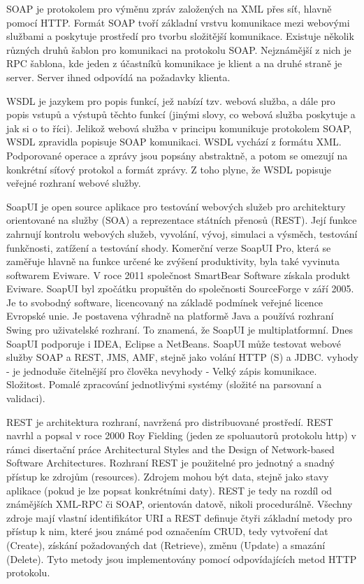 SOAP je protokolem pro výměnu zpráv založených na XML přes síť, hlavně pomocí HTTP. Formát SOAP tvoří základní vrstvu komunikace mezi webovými službami a poskytuje prostředí pro tvorbu složitější komunikace. Existuje několik různých druhů šablon pro komunikaci na protokolu SOAP. Nejznámější z nich je RPC šablona, kde jeden z účastníků komunikace je klient a na druhé straně je server. Server ihned odpovídá na požadavky klienta.

WSDL je jazykem pro popis funkcí, jež nabízí tzv. webová služba, a dále pro popis vstupů a výstupů těchto funkcí (jinými slovy, co webová služba poskytuje a jak si o to říci). Jelikož webová služba v principu komunikuje protokolem SOAP, WSDL zpravidla popisuje SOAP komunikaci. WSDL vychází z formátu XML. Podporované operace a zprávy jsou popsány abstraktně, a potom se omezují na konkrétní síťový protokol a formát zprávy. Z toho plyne, že WSDL popisuje veřejné rozhraní webové služby.

SoapUI je open source aplikace pro testování webových služeb pro architektury orientované na služby (SOA) a reprezentace státních přenosů (REST). Její funkce zahrnují kontrolu webových služeb, vyvolání, vývoj, simulaci a výsměch, testování funkčnosti, zatížení a testování shody. Komerční verze SoapUI Pro, která se zaměřuje hlavně na funkce určené ke zvýšení produktivity, byla také vyvinuta softwarem Eviware. V roce 2011 společnost SmartBear Software získala produkt Eviware. SoapUI byl zpočátku propuštěn do společnosti SourceForge v září 2005. Je to svobodný software, licencovaný na základě podmínek veřejné licence Evropské unie. Je postavena výhradně na platformě Java a používá rozhraní Swing pro uživatelské rozhraní. To znamená, že SoapUI je multiplatformní. Dnes SoapUI podporuje i IDEA, Eclipse a NetBeans. SoapUI může testovat webové služby SOAP a REST, JMS, AMF, stejně jako volání HTTP (S) a JDBC.
vyhody - je jednoduše čitelnější pro člověka
nevyhody - Velký zápis komunikace. Složitost. Pomalé zpracování jednotlivými systémy (složité na parsovaní a validaci).

REST je architektura rozhraní, navržená pro distribuované prostředí. REST navrhl a popsal v roce 2000 Roy Fielding (jeden ze spoluautorů protokolu http) v rámci disertační práce Architectural Styles and the Design of Network-based Software Architectures. Rozhraní REST je použitelné pro jednotný a snadný přístup ke zdrojům (resources). Zdrojem mohou být data, stejně jako stavy aplikace (pokud je lze popsat konkrétními daty). REST je tedy na rozdíl od známějších XML-RPC či SOAP, orientován datově, nikoli procedurálně. Všechny zdroje mají vlastní identifikátor URI a REST definuje čtyři základní metody pro přístup k nim, které jsou známé pod označením CRUD, tedy vytvoření dat (Create), získání požadovaných dat (Retrieve), změnu (Update) a smazání (Delete). Tyto metody jsou implementovány pomocí
odpovídajících metod HTTP protokolu.


